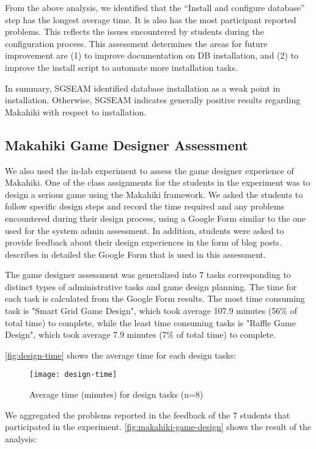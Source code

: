 From the above analysis, we identified that the ``Install and configure database'' step has the
longest average time. It is also has the most participant reported problems. This reflects the issues
encountered by students during the configuration process. This assessment determines the areas for future
improvement are (1) to improve documentation on DB installation, and (2) to improve the install script to automate
more installation tasks.

In summary, SGSEAM identified database installation as a weak point in
installation.  Otherwise, SGSEAM indicates generally positive results regarding
Makahiki with respect to installation.

\subsection{Makahiki Game Designer Assessment}

We also used the in-lab experiment to assess the game
designer experience of Makahiki. One of the class assignments for the students in the
experiment was to design a serious game using the Makahiki framework. We asked the students
to follow specific design steps and record the time required and any problems encountered during
their design process, using a Google Form similar to the one used for the system admin
assessment. In addition, students were asked to provide feedback about their
design experiences in the form of blog posts. \cite{csdl2-13-04} describes in detailed
the Google Form that is used in this assessment.

The game designer assessment was generalized into 7 tasks corresponding to
distinct types of administrative tasks and game design planning. The time for each task is
calculated from the Google Form results.  The most time consuming task
 is "Smart Grid Game Design", which took average 107.9 minutes (56\% of total time) to complete,
 while the least time
  consuming tasks is "Raffle Game Design", which took average 7.9 minutes (7\% of total time)
  to complete.

\autoref{fig:design-time} shows the average time for each design tasks:

\begin{figure}[ht!]
  \center
  \texttt{[image: design-time]}
  \caption{Average time (minutes) for design tasks (n=8)}
  \label{fig:design-time}
\end{figure}

 We aggregated the problems reported in the feedback of the 7 students that participated in the experiment.
\autoref{fig:makahiki-game-design} shows the result of the analysis:

